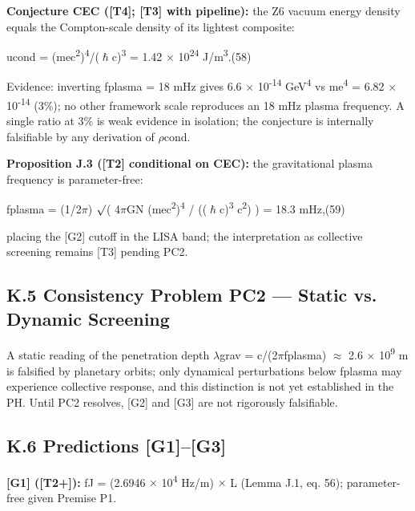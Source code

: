 \documentclass[11pt,letterpaper]{article}
\begin{document}
\noindent \textbf{Conjecture CEC ([T4]; [T3] with pipeline): }the Z6 vacuum energy density equals the Compton-scale density of its lightest composite:

\begingroup\centering ucond = (mec\textsuperscript{2})\textsuperscript{4}/($\hslash$c)\textsuperscript{3} = 1.42 $\times$ 10\textsuperscript{24} J/m\textsuperscript{3}.\hspace{2em}(58)\par\endgroup

\noindent Evidence: inverting fplasma = 18 mHz gives 6.6 $\times$ 10\textsuperscript{-14} GeV\textsuperscript{4} vs me\textsuperscript{4} = 6.82 $\times$ 10\textsuperscript{-14} (3\%); no other framework scale reproduces an 18 mHz plasma frequency. A single ratio at 3\% is weak evidence in isolation; the conjecture is internally falsifiable by any derivation of $\rho$cond.

\noindent \textbf{Proposition J.3 ([T2] conditional on CEC): }the gravitational plasma frequency is parameter-free:

\begingroup\centering fplasma = (1/2$\pi$) $\surd$( 4$\pi$GN (mec\textsuperscript{2})\textsuperscript{4} / (($\hslash$c)\textsuperscript{3} c\textsuperscript{2}) ) = 18.3 mHz,\hspace{2em}(59)\par\endgroup

\noindent placing the [G2] cutoff in the LISA band; the interpretation as collective screening remains [T3] pending PC2.

\subsection*{K.5  Consistency Problem PC2 --- Static vs. Dynamic Screening}

\noindent [Open] A static reading of the penetration depth $\lambda$grav = c/(2$\pi$fplasma) $\approx$ 2.6 $\times$ 10\textsuperscript{9} m is falsified by planetary orbits; only dynamical perturbations below fplasma may experience collective response, and this distinction is not yet established in the PH. Until PC2 resolves, [G2] and [G3] are not rigorously falsifiable.

\subsection*{K.6  Predictions [G1]--[G3]}

\noindent \textbf{[G1] ([T2+]): }fJ = (2.6946 $\times$ 10\textsuperscript{4} Hz/m) $\times$ L (Lemma J.1, eq. 56); parameter-free given Premise P1.
\end{document}
